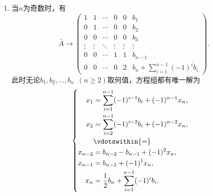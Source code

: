 \documentclass[UTF8,12pt,a4paper,fontset=fandol]{ctexart}
\begin{document}
\begin{solve}
\begin{enumerate}
                \item 当$n$为奇数时，有
                      \[ \bar{A}\rightarrow\begin{pmatrix}
                              1      & 1      & \cdots & 0      & 0      & b_1                                        \\
                              0      & 1      & \cdots & 0      & 0      & b_2                                        \\
                              0      & 0      & \cdots & 0      & 0      & b_3                                        \\
                              \vdots & \vdots & \ddots & \vdots & \vdots & \vdots                                     \\
                              0      & 0      & \cdots & 1      & 1      & b_{n-1}                                    \\
                              0      & 0      & \cdots & 0      & 2      & b_n+\displaystyle\sum_{i=1}^{n-1}(-1)^ib_i
                          \end{pmatrix}. \]
                      此时无论$b_1,b_2,\ldots,b_n\enspace(n\geqslant 2)$取何值，方程组都有唯一解为
                      \[\begin{cases} \begin{aligned}
                                  x_1     & =\displaystyle\sum_{i=1}^{n-1}(-1)^{i-1}b_i+(-1)^{n-1}x_n, \\
                                  x_2     & =\displaystyle\sum_{i=2}^{n-1}(-1)^{i-2}b_i+(-1)^{n-2}x_n, \\
                                          & \vdotswithin{ = }                                          \\
                                  x_{n-2} & =b_{n-2}-b_{n-1}+(-1)^2x_n,                                \\
                                  x_{n-1} & =b_{n-1}+(-1)^1x_n,                                        \\
                                  x_n     & =\frac 12b_n+\displaystyle\sum_{i=1}^{n-1}(-1)^ib_i.
                              \end{aligned} \end{cases}\]
            \end{enumerate}
\end{solve}
\end{document}
